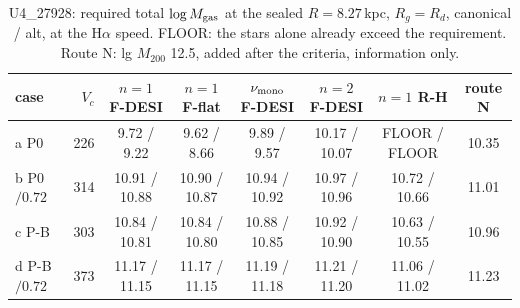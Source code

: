\begin{table}[h]\centering\small\caption{U4\_27928: required total $\log M_{\rm gas}$ at the sealed $R=8.27$\,kpc, $R_g=R_d$, canonical / alt, at the H$\alpha$ speed. FLOOR: the stars alone already exceed the requirement. Route N: lg $M_{200}$ 12.5, added after the criteria, information only.}\label{t:u4a}\begin{tabular}{lrcccccc}\toprule
case & $V_c$ & $n{=}1$ F-DESI & $n{=}1$ F-flat & $\nu_{\rm mono}$ F-DESI & $n{=}2$ F-DESI & $n{=}1$ R-H & route N \\ \midrule
a P0 & 226 & 9.72 / 9.22 & 9.62 / 8.66 & 9.89 / 9.57 & 10.17 / 10.07 & FLOOR / FLOOR & 10.35 \\
b P0 $/0.72$ & 314 & 10.91 / 10.88 & 10.90 / 10.87 & 10.94 / 10.92 & 10.97 / 10.96 & 10.72 / 10.66 & 11.01 \\
c P-B & 303 & 10.84 / 10.81 & 10.84 / 10.80 & 10.88 / 10.85 & 10.92 / 10.90 & 10.63 / 10.55 & 10.96 \\
d P-B $/0.72$ & 373 & 11.17 / 11.15 & 11.17 / 11.15 & 11.19 / 11.18 & 11.21 / 11.20 & 11.06 / 11.02 & 11.23 \\
\bottomrule\end{tabular}\end{table}
